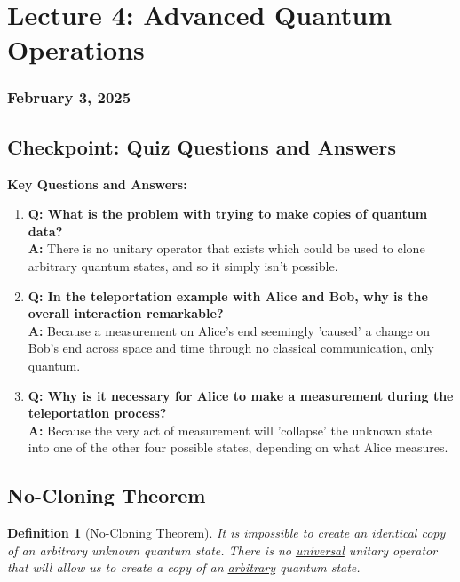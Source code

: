 \documentclass{article}
\newtheorem{definition}[theorem]{Definition}
\begin{document}
\newpage
\section{Lecture 4: Advanced Quantum Operations}
\subsubsection*{February 3, 2025}

\subsection{Checkpoint: Quiz Questions and Answers}
\begin{conceptbox}
\textbf{Key Questions and Answers:}
\begin{enumerate}
    \item \textbf{Q: What is the problem with trying to make copies of quantum data?} \\
    \textbf{A:} There is no unitary operator that exists which could be used to clone arbitrary quantum states, and so it simply isn't possible.
    
    \item \textbf{Q: In the teleportation example with Alice and Bob, why is the overall interaction remarkable?} \\
    \textbf{A:} Because a measurement on Alice's end seemingly 'caused' a change on Bob's end across space and time through no classical communication, only quantum.
    
    \item \textbf{Q: Why is it necessary for Alice to make a measurement during the teleportation process?} \\
    \textbf{A:} Because the very act of measurement will 'collapse' the unknown state into one of the other four possible states, depending on what Alice measures.
\end{enumerate}
\end{conceptbox}

\subsection{No-Cloning Theorem}
\begin{definition}[No-Cloning Theorem]
It is impossible to create an identical copy of an arbitrary unknown quantum state. There is no \underline{universal} unitary operator that will allow us to create a copy of an \underline{arbitrary} quantum state.
\end{definition}
\end{document}

